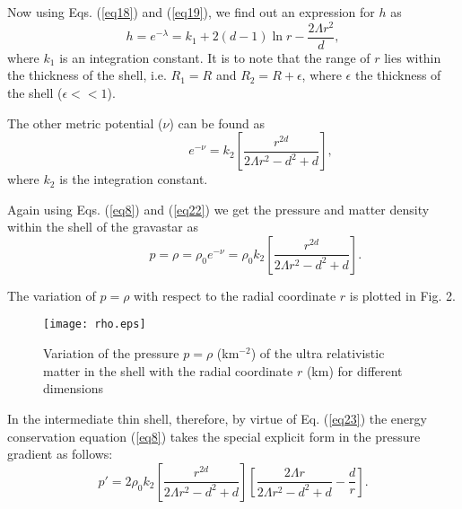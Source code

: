 \documentclass[preprint,12pt]{elsarticle}
\begin{document}
Now using Eqs. (\ref{eq18}) and (\ref{eq19}), we find out an expression for $h$ as
\begin{equation}
h=e^{-\lambda} = k_{1}+ 2 (d-1) \ln r - \frac{2 \Lambda r^2}{d},\label{eq21}
\end{equation}
where $k_{1}$ is an integration constant. It is to note that the range of $r$ lies within the thickness of the shell, i.e. $R_1=R$ and $R_2=R+\epsilon$, where $\epsilon$ the thickness of the shell ($\epsilon <<1$).

The other metric potential ($\nu$) can be found as
\begin{equation}
~~~~~~~~~~~~~~~~~~~~e^{-\nu}=k_2 \left[\frac{r^{2d}}{2\Lambda r^2 -d^2+d}\right],\label{eq22}
\end{equation}
where $k_2$ is the integration constant.

Again using Eqs. (\ref{eq8}) and (\ref{eq22}) we get the pressure and matter density
within the shell of the gravastar as
\begin{equation}
~~~~~~~~~~~~~~~~p=\rho=\rho_0e^{-\nu}=\rho_0 k_2 \left[\frac{r^{2d}}{2\Lambda r^2 -d^2+d}\right].\label{eq23}
\end{equation}

The variation of $p=\rho$ with respect to the radial coordinate $r$ is plotted in Fig. 2.

\begin{figure*}[thbp]
\centering
\texttt{[image: rho.eps]}\\
\caption{Variation of the pressure $p=\rho$ (km$^{-2}$) of the ultra
relativistic matter in the shell with the radial coordinate $r$ (km) for different
dimensions}
\end{figure*}


In the intermediate thin shell, therefore, by virtue of Eq. (\ref{eq23}) the energy conservation equation (\ref{eq8}) takes the special explicit form in the pressure gradient as follows:
\begin{equation}
p'=2\rho_0 k_2 \left[\frac{r^{2d}}{2\Lambda r^2 -d^2+d}\right]\left[\frac{2\Lambda r}{2\Lambda r^2-d^2+d}-\frac{d}{r}\right].\label{eq24}
\end{equation}
\end{document}
